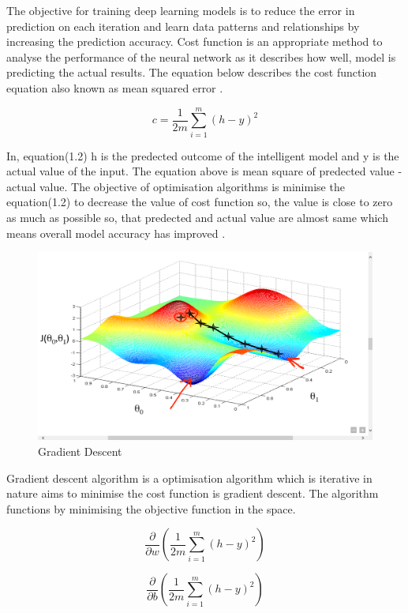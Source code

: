 The objective for training deep learning models is to reduce
the error in prediction on each iteration and 
learn data patterns and relationships by increasing the 
prediction accuracy. Cost function is an appropriate method to 
analyse the performance of the neural network as it describes 
how well, model is predicting the actual results. The equation below 
describes the cost function equation also known as mean squared error \citep{7013173}.
\vspace{2mm}

\begin{center}
\begin{equation}
    c = \frac{1}{2m} \sum_{i=1}^m(h - y)^2
\end{equation}
\end{center}

In, equation(1.2)  h is the predected outcome of the intelligent model 
and y is the actual value of the input. The equation above is mean square of 
predected value - actual value. The objective of optimisation algorithms is 
minimise the equation(1.2) to decrease the value of cost function so, the value is 
close to zero as much as possible so, that predected and actual 
value are almost same which means overall model accuracy has improved \citep{7013173}.

\begin{figure}[!htp]
    \centering
    \includegraphics[width=\textwidth]{Images/gd.png}
    \caption{Gradient Descent}
\end{figure}

Gradient descent algorithm  is a optimisation algorithm which is iterative in nature aims 
to minimise the cost function is gradient descent. The algorithm functions by minimising the objective 
function in the space. 

\begin{center}
    \begin{equation}
            \frac{\partial }{\partial w} (\frac{1}{2m} \sum_{i=1}^m(h - y)^2)
    \end{equation}

    \begin{equation}
        \frac{\partial }{\partial b} (\frac{1}{2m} \sum_{i=1}^m(h - y)^2) 
    \end{equation}
\end{center}


